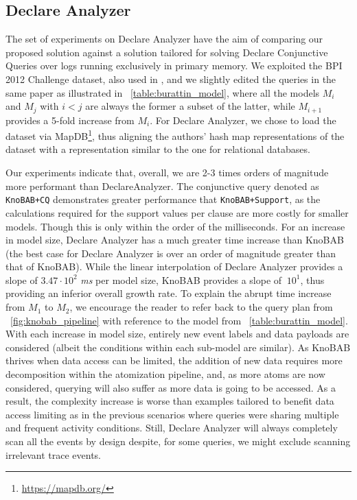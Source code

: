 \subsection{Declare Analyzer}\label{ssec:declan}
The set of experiments on Declare Analyzer have the aim of comparing our proposed solution against a solution tailored for solving Declare Conjunctive Queries over logs running exclusively in primary memory. %
We exploited the BPI 2012 Challenge dataset, also used in \cite{BurattinMS16}, and we slightly edited the queries in the same paper as illustrated in \tablename~\ref{table:burattin_model}, where all the models $M_i$ and $M_j$ with $i<j$ are always the former a subset of the latter, while $M_{i+1}$ provides a 5-fold increase from $M_i$. For Declare Analyzer, we chose to load the dataset via MapDB\footnote{\url{https://mapdb.org/}}, thus aligning the authors' hash map representations of the dataset with a representation similar to the one for relational databases. 


Our experiments indicate that, overall, we are 2-3 times orders of magnitude more performant than DeclareAnalyzer. The conjunctive query denoted as \texttt{KnoBAB+CQ} demonstrates greater performance that \texttt{KnoBAB+Support}, as the calculations required for the support values per clause are more costly for smaller models. Though this is only within the order of the milliseconds. For an increase in model size, Declare Analyzer has a much greater time increase than KnoBAB (the best case for Declare Analyzer is over an order of magnitude greater than that of KnoBAB). %
While the linear interpolation of Declare Analyzer provides a slope of $3.47\cdot 10^2$ \textit{ms} per model size, KnoBAB provides a slope of $~10^1$, thus providing an inferior overall growth rate. To explain the abrupt time increase from $M_1$ to $M_2$, we encourage the reader to refer back to the query plan from \figurename~\ref{fig:knobab_pipeline} with reference to the model from \tablename~\ref{table:burattin_model}. With each increase in model size, entirely new event labels and data payloads are considered (albeit the conditions within each sub-model are similar). As KnoBAB thrives when data access can be limited, the addition of new data requires more decomposition within the atomization pipeline, and, as more atoms are now considered, querying will also suffer as more data is going to be accessed. As a result, the complexity increase is worse than examples tailored to benefit data access limiting as in the previous scenarios where queries were sharing multiple and frequent activity conditions. Still, Declare Analyzer will always completely scan all the events by design despite, for some queries, we might exclude scanning irrelevant trace events.

